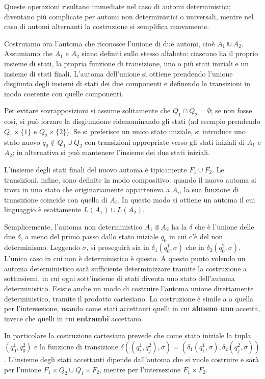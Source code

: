 Queste operazioni risultano immediate nel caso di automi deterministici; diventano più complicate per automi non deterministici o universali, mentre nel caso di automi alternanti la costruzione si semplifica nuovamente.

Costruiamo ora l'automa che riconosce l'unione di due automi, cioè \(A_1 \Cup A_2\). Assumiamo che \(A_1\) e \(A_2\) siano definiti sullo stesso alfabeto: ciascuno ha il proprio insieme di stati, la propria funzione di transizione, uno o più stati iniziali e un insieme di stati finali. L'automa dell'unione si ottiene prendendo l'unione disgiunta degli insiemi di stati dei due componenti e definendo le transizioni in modo coerente con quelle componenti.

Per evitare sovrapposizioni si assume solitamente che \(Q_1\cap Q_2=\emptyset\); se non fosse così, si può forzare la disgiunzione ridenominando gli stati (ad esempio prendendo \(Q_1\times\{1\}\) e \(Q_2\times\{2\}\)). Se si preferisce un unico stato iniziale, si introduce uno stato nuovo \(q_0\notin Q_1\cup Q_2\) con transizioni appropriate verso gli stati iniziali di \(A_1\) e \(A_2\); in alternativa si può mantenere l'insieme dei due stati iniziali.

L'insieme degli stati finali del nuovo automa è tipicamente \(F_1\cup F_2\). Le transizioni, infine, sono definite in modo compositivo: quando il nuovo automa si trova in uno stato che originariamente apparteneva a \(A_i\), la sua funzione di transizione coincide con quella di \(A_i\). In questo modo si ottiene un automa il cui linguaggio è esattamente \(L(A_1)\cup L(A_2)\).


Semplicemente, l'automa non deterministico \(A_1 \Cup A_2\) ha la \(\delta\) che è l'unione delle due \(\delta\), a meno del primo passo dallo stato iniziale \(q_0\) in cui c'è del non determinismo. Leggendo \(\sigma\), si proseguirà sia in \(\delta_1(q_0^1, \sigma)\) che in \(\delta_2(q_0^2, \sigma)\). L'unico caso in cui non è deterministico è questo. A questo punto volendo un automa deterministico sarà sufficiente determinizzare tramite la costruzione a sottinsiemi, in cui ogni sott'insieme di stati diventa uno stato dell'automa deterministico. Esiste anche un modo di costruire l'automa unione direttamente deterministico, tramite il prodotto cartesiano. La costruzione è simile a a quella per l'intersezione, usando come stati accettanti quelli in cui \textbf{almeno uno} accetta, invece che quelli in cui \textbf{entrambi} accettano. 

In particolare la costruzione cartesiana prevede che come stato iniziale la tupla \((q^1_0, q^2_0)\) e la funzione di transizione \(\delta((q^1_i, q^2_j), \sigma) = (\delta_1(q^1_i, \sigma), \delta_2(q^2_j, \sigma))\). L'insieme degli stati accettanti dipende dall'automa che si vuole costruire e sarà per l'unione \(F_1\times Q_2 \cup Q_1\times F_2\), mentre per l'intersezione \(F_1 \times F_2\).

